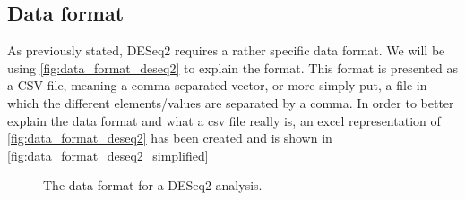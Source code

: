 \documentclass[11pt]{article}
\begin{document}
\subsection{Data format \label{deseq2 data_format}}
As previously stated, DESeq2 requires a rather specific data format. We will be using \autoref{fig:data_format_deseq2} to explain the format.
This format is presented as a CSV file, meaning a comma separated vector, or more simply put, a file in which the different elements/values are separated by a comma.
In order to better explain the data format and what a csv file really is, an excel representation of \autoref{fig:data_format_deseq2} has been created and is shown in \autoref{fig:data_format_deseq2_simplified}

\begin{figure}[h!]
\centering
{}
\caption{The data format for a DESeq2 analysis.}
\label{fig:data_format_deseq2}
\end{figure}
\end{document}
